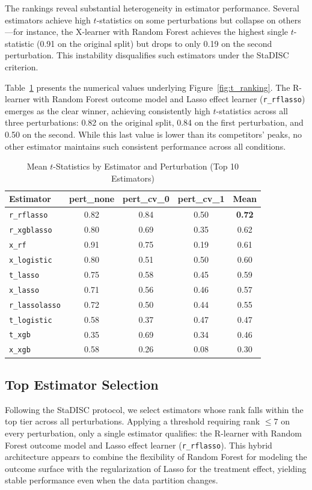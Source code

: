 \documentclass[11pt,a4paper]{article}
\begin{document}
The rankings reveal substantial heterogeneity in estimator performance. Several estimators achieve high $t$-statistics on some perturbations but collapse on others---for instance, the X-learner with Random Forest achieves the highest single $t$-statistic (0.91 on the original split) but drops to only 0.19 on the second perturbation. This instability disqualifies such estimators under the StaDISC criterion.

Table~\ref{tab:rankings} presents the numerical values underlying Figure~\ref{fig:t_ranking}. The R-learner with Random Forest outcome model and Lasso effect learner (\texttt{r\_rflasso}) emerges as the clear winner, achieving consistently high $t$-statistics across all three perturbations: 0.82 on the original split, 0.84 on the first perturbation, and 0.50 on the second. While this last value is lower than its competitors' peaks, no other estimator maintains such consistent performance across all conditions.

\begin{table}[H]
	\centering
	\caption{Mean $t$-Statistics by Estimator and Perturbation (Top 10 Estimators)}
	\label{tab:rankings}
	\begin{tabular}{lcccc}
		\toprule
		\textbf{Estimator} & \textbf{pert\_none} & \textbf{pert\_cv\_0} & \textbf{pert\_cv\_1} & \textbf{Mean} \\
		\midrule
		\texttt{r\_rflasso} & 0.82 & 0.84 & 0.50 & \textbf{0.72} \\
		\texttt{r\_xgblasso} & 0.80 & 0.69 & 0.35 & 0.62 \\
		\texttt{x\_rf} & 0.91 & 0.75 & 0.19 & 0.61 \\
		\texttt{x\_logistic} & 0.80 & 0.51 & 0.50 & 0.60 \\
		\texttt{t\_lasso} & 0.75 & 0.58 & 0.45 & 0.59 \\
		\texttt{x\_lasso} & 0.71 & 0.56 & 0.46 & 0.57 \\
		\texttt{r\_lassolasso} & 0.72 & 0.50 & 0.44 & 0.55 \\
		\texttt{t\_logistic} & 0.58 & 0.37 & 0.47 & 0.47 \\
		\texttt{t\_xgb} & 0.35 & 0.69 & 0.34 & 0.46 \\
		\texttt{x\_xgb} & 0.58 & 0.26 & 0.08 & 0.30 \\
		\bottomrule
	\end{tabular}
\end{table}

\subsection{Top Estimator Selection}
Following the StaDISC protocol, we select estimators whose rank falls within the top tier across all perturbations. Applying a threshold requiring rank $\leq 7$ on every perturbation, only a single estimator qualifies: the R-learner with Random Forest outcome model and Lasso effect learner (\texttt{r\_rflasso}). This hybrid architecture appears to combine the flexibility of Random Forest for modeling the outcome surface with the regularization of Lasso for the treatment effect, yielding stable performance even when the data partition changes.
\end{document}
